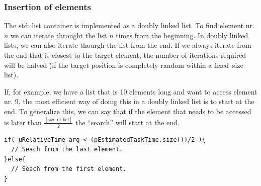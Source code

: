 	\subsubsection{Insertion of elements}
	The std::list container is implemented as a doubly linked list\cite{Stroustrup2000KAP16}.
	To find element nr. $n$ we can iterate throught the list $n$ times from the beginning.
	In doubly linked lists, we can also iterate thourgh the list from the end.
	If we always iterate from the end that is closest to the target element, the number of iterations required will be halved (if the target position is completely random within a fixed--size list).

	If, for example, we have a list that is 10 elements long and want to access element nr. 9, the most efficient way of doing this in a doubly linked list is to start at the end.
	To generalize this, we can say that if the element that needs to be accessed is later than $\frac{[\text{size of list}]}{2}$ the ``search'' will start at the end.

\begin{lstlisting}
if( uRelativeTime_arg < (pEstimatedTaskTime.size())/2 ){
  // Seach from the last element.
}else{
  // Seach from the first element.
}
\end{lstlisting}

